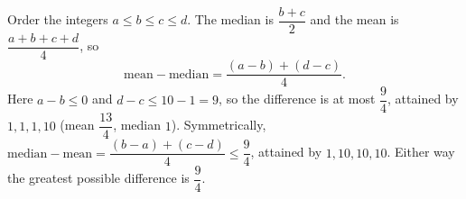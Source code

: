 Order the integers $a\le b\le c\le d$. The median is $\dfrac{b+c}{2}$ and the mean is $\dfrac{a+b+c+d}{4}$, so
\[
\text{mean}-\text{median}=\dfrac{(a-b)+(d-c)}{4}.
\]
Here $a-b\le0$ and $d-c\le10-1=9$, so the difference is at most $\dfrac{9}{4}$, attained by $1,1,1,10$ (mean $\dfrac{13}{4}$, median $1$). Symmetrically, $\text{median}-\text{mean}=\dfrac{(b-a)+(c-d)}{4}\le\dfrac{9}{4}$, attained by $1,10,10,10$. Either way the greatest possible difference is $\boxed{\dfrac{9}{4}}$.
